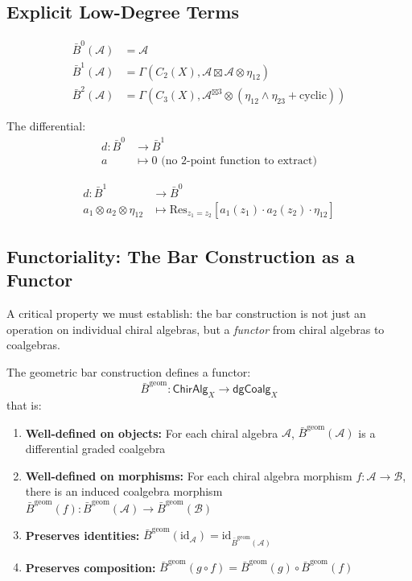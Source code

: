 \subsection{Explicit Low-Degree Terms}

\begin{example}
\begin{align}
\bar{B}^0(\mathcal{A}) &= \mathcal{A} \\
\bar{B}^1(\mathcal{A}) &= \Gamma(C_2(X), \mathcal{A} \boxtimes \mathcal{A} \otimes \eta_{12}) \\
\bar{B}^2(\mathcal{A}) &= \Gamma(C_3(X), \mathcal{A}^{\boxtimes 3} \otimes (\eta_{12} \wedge \eta_{23} + \text{cyclic}))
\end{align}

The differential:
\begin{align}
d: \bar{B}^0 &\to \bar{B}^1 \\
a &\mapsto 0 \text{ (no 2-point function to extract)}
\end{align}

\begin{align}
d: \bar{B}^1 &\to \bar{B}^0 \\
a_1 \otimes a_2 \otimes \eta_{12} &\mapsto \text{Res}_{z_1=z_2}[a_1(z_1) \cdot a_2(z_2) \cdot \eta_{12}]
\end{align}
\end{example}

\subsection{Functoriality: The Bar Construction as a Functor}
\label{subsec:bar-functoriality}

A critical property we must establish: the bar construction is not just an operation on individual chiral algebras, but a \emph{functor} from chiral algebras to coalgebras.

\begin{theorem}\label{thm:bar-functorial-complete}
The geometric bar construction defines a functor:
$$\bar{B}^{\text{geom}}: \mathsf{ChirAlg}_X \to \mathsf{dgCoalg}_X$$
that is:
\begin{enumerate}
\item \textbf{Well-defined on objects:} For each chiral algebra $\mathcal{A}$, $\bar{B}^{\text{geom}}(\mathcal{A})$ is a differential graded coalgebra
\item \textbf{Well-defined on morphisms:} For each chiral algebra morphism $f: \mathcal{A} \to \mathcal{B}$, there is an induced coalgebra morphism $\bar{B}^{\text{geom}}(f): \bar{B}^{\text{geom}}(\mathcal{A}) \to \bar{B}^{\text{geom}}(\mathcal{B})$
\item \textbf{Preserves identities:} $\bar{B}^{\text{geom}}(\text{id}_\mathcal{A}) = \text{id}_{\bar{B}^{\text{geom}}(\mathcal{A})}$
\item \textbf{Preserves composition:} $\bar{B}^{\text{geom}}(g \circ f) = \bar{B}^{\text{geom}}(g) \circ \bar{B}^{\text{geom}}(f)$
\end{enumerate}
\end{theorem}

